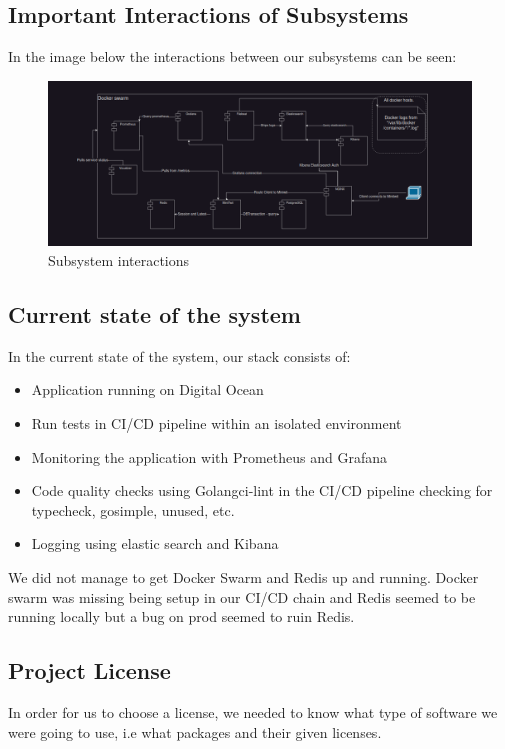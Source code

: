 \subsection{Important Interactions of Subsystems}
In the image below the interactions between our subsystems can be seen:

\begin{figure}[H]
    \centering
    \captionsetup{justification=centering,margin=1cm}
    \includegraphics[width=0.8\linewidth]{report/images/InteractionsOfSystems.png}
    \caption{Subsystem interactions}
    \label{fig:minitwit}
\end{figure}

\subsection{Current state of the system}
In the current state of the system, our stack consists of: 
\begin{itemize}
    \item Application running on Digital Ocean
    \item Run tests in CI/CD pipeline within an isolated environment
    \item Monitoring the application with Prometheus and Grafana
    \item Code quality checks using Golangci-lint in the CI/CD pipeline checking for typecheck, gosimple, unused, etc.
    \item Logging using elastic search and Kibana
\end{itemize}
We did not manage to get Docker Swarm and Redis up and running. Docker swarm was missing being setup 
in our CI/CD chain and Redis seemed to be running locally but a bug on prod seemed to ruin Redis.

\subsection{Project License}
In order for us to choose a license, we needed to know what type of software we were going to use, i.e what packages and their given licenses. 

